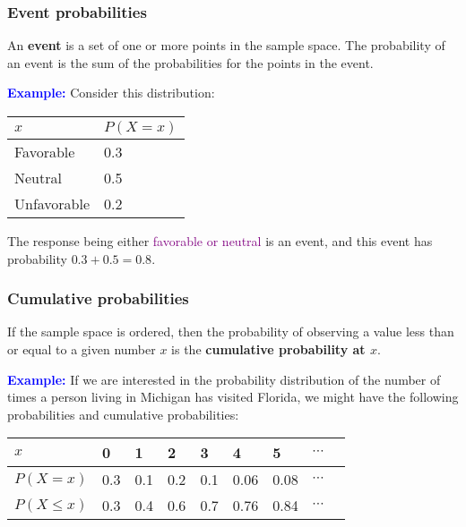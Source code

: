 \begin{frame}
\frametitle{Event probabilities}

An {\bf event} is a set of one or more points in the sample space.
The probability of an event is the sum of the probabilities for the
points in the event.

\textcolor{blue}{\bf Example:} Consider this distribution:

\begin{center}
\begin{tabular}{ll}
{$x$} & {$P(X=x)$}\\\hline 
Favorable & \hspace{0.8cm}0.3 \\
Neutral & \hspace{0.8cm}0.5 \\
Unfavorable & \hspace{0.8cm}0.2 \\\hline
\end{tabular}
\end{center}

The response being either \textcolor{purple}{favorable or neutral} is
an event, and this event has probability $0.3+0.5=0.8$.

\end{frame}

\begin{frame}
\frametitle{Cumulative probabilities}

If the sample space is ordered, then the probability of observing a
value less than or equal to a given number $x$ is the {\bf cumulative
  probability at $x$}.

\textcolor{blue}{\bf Example:} If we are interested in the probability
distribution of the number of times a person living in Michigan has
visited Florida, we might have the following probabilities and
cumulative probabilities:

\begin{center}
\begin{tabular}{lllllllll}
$x$         & 0   & 1 & 2 & 3 & 4 & 5 & $\cdots$\\\hline
$P(X=x)$    & 0.3 & 0.1 & 0.2 & 0.1 & 0.06 & 0.08 & $\cdots$\\
$P(X\le x)$ & 0.3 & 0.4 & 0.6 & 0.7 & 0.76 & 0.84 & $\cdots$\\\hline
\end{tabular}
\end{center}

\end{frame}


